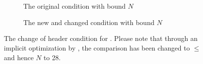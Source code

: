 \begin{figure}[H]
    \begin{subfigure}[t]{0.5\textwidth}
        \centering
        \begin{adjustbox}{max width=0.49\textwidth}
            \centering
            
        \end{adjustbox}
        \caption{The original condition with bound $N$}
    \end{subfigure}
    \begin{subfigure}[t]{0.5\textwidth}
        \centering
        \begin{adjustbox}{max width=0.49\textwidth}
            \centering
            
        \end{adjustbox}
        \caption{The new and changed condition with bound $\hat{N}$}
    \end{subfigure}
    \caption{
    The change of header condition for .
    Please note that through an implicit optimization by \libFIRM{}, the comparison has been changed to $\leq$ and hence $N$ to 28.
    }
    \label{fig:impl:fixup:header-cond:firm}
\end{figure}